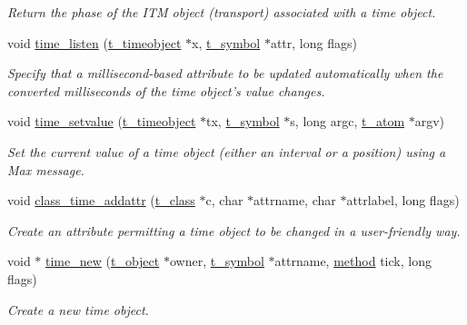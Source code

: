 \begin{DoxyCompactItemize}
\begin{DoxyCompactList}\small\item\em Return the phase of the ITM object (transport) associated with a time object. \item\end{DoxyCompactList}\item 
void \hyperlink{group__time_gaf8a102f28b262991c6e4c3b79f37b611}{time\_\-listen} (\hyperlink{group__time_gab568d2ffd4d84ca17c0b90cf2f7c6a40}{t\_\-timeobject} $\ast$x, \hyperlink{structt__symbol}{t\_\-symbol} $\ast$attr, long flags)
\begin{DoxyCompactList}\small\item\em Specify that a millisecond-\/based attribute to be updated automatically when the converted milliseconds of the time object's value changes. \item\end{DoxyCompactList}\item 
void \hyperlink{group__time_ga7451e479ce77e4dcf7a13bbd933575ed}{time\_\-setvalue} (\hyperlink{group__time_gab568d2ffd4d84ca17c0b90cf2f7c6a40}{t\_\-timeobject} $\ast$tx, \hyperlink{structt__symbol}{t\_\-symbol} $\ast$s, long argc, \hyperlink{structt__atom}{t\_\-atom} $\ast$argv)
\begin{DoxyCompactList}\small\item\em Set the current value of a time object (either an interval or a position) using a Max message. \item\end{DoxyCompactList}\item 
void \hyperlink{group__time_ga95e5b2330715823c8a609ccd500aa361}{class\_\-time\_\-addattr} (\hyperlink{structt__class}{t\_\-class} $\ast$c, char $\ast$attrname, char $\ast$attrlabel, long flags)
\begin{DoxyCompactList}\small\item\em Create an attribute permitting a time object to be changed in a user-\/friendly way. \item\end{DoxyCompactList}\item 
void $\ast$ \hyperlink{group__time_gaf6153d8f28738932c0ea3906a6c51696}{time\_\-new} (\hyperlink{structt__object}{t\_\-object} $\ast$owner, \hyperlink{structt__symbol}{t\_\-symbol} $\ast$attrname, \hyperlink{group__datatypes_gac26ba0a173b50597f5738132e059b42d}{method} tick, long flags)
\begin{DoxyCompactList}\small\item\em Create a new time object. \item\end{DoxyCompactList}\item 

\end{DoxyCompactItemize}

